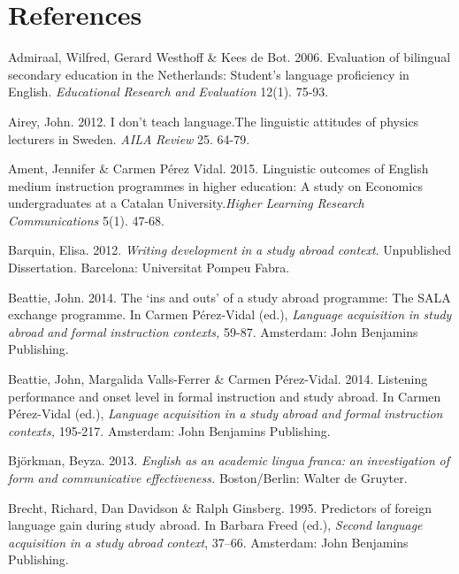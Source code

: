 \section{ References}

Admiraal, Wilfred, Gerard Westhoff \& Kees de Bot. 2006. Evaluation of bilingual secondary education in the Netherlands: Student’s language proficiency in English. \textit{Educational} \textit{Research} \textit{and} \textit{Evaluation} 12(1). 75-93.  

Airey, John. 2012. I don’t teach language.The linguistic attitudes of physics lecturers in Sweden. \textit{AILA} \textit{Review}{} 25. 64-79.

Ament, Jennifer \& Carmen Pérez Vidal. 2015. Linguistic outcomes of English medium instruction programmes in higher education: A study on Economics undergraduates at a Catalan University.\textit{Higher} \textit{Learning} \textit{Research} \textit{Communications} 5(1). 47-68.

Barquin, Elisa. 2012. \textit{Writing} \textit{development} \textit{in} \textit{a} \textit{study} \textit{abroad} \textit{context}. Unpublished Dissertation. Barcelona: Universitat Pompeu Fabra.

Beattie, John. 2014. The ‘ins and outs’ of a study abroad programme: The SALA exchange programme. In Carmen Pérez-Vidal (ed.), \textit{Language} \textit{acquisition} \textit{in} \textit{study} \textit{abroad} \textit{and} \textit{formal} \textit{instruction} \textit{contexts,} 59-87. Amsterdam: John Benjamins Publishing. 

Beattie, John, Margalida Valls-Ferrer \& Carmen Pérez-Vidal. 2014. Listening performance and onset level in formal instruction and study abroad. In Carmen Pérez-Vidal (ed.), \textit{Language} \textit{acquisition} \textit{in} \textit{a} \textit{study} \textit{abroad} \textit{and} \textit{formal} \textit{instruction} \textit{contexts,} 195-217. Amsterdam: John Benjamins Publishing. 

Björkman, Beyza. 2013. \textit{English} \textit{as} \textit{an} \textit{academic} \textit{lingua} \textit{franca:} \textit{an} \textit{investigation} \textit{of} \textit{form} \textit{and} \textit{communicative} \textit{effectiveness.} Boston/Berlin: Walter de Gruyter. 

Brecht, Richard, Dan Davidson \& Ralph Ginsberg. 1995. Predictors of foreign language gain during study abroad. In Barbara Freed (ed.), \textit{Second} \textit{language} \textit{acquisition} \textit{in} \textit{a} \textit{study} \textit{abroad} \textit{context}, 37–66. Amsterdam: John Benjamins Publishing. 

